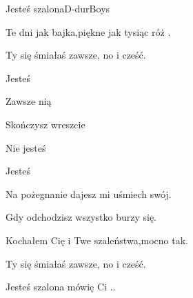 \begin{song}{Jesteś szalona}{D-dur}{}{Boys}{}{}
  \begin{SBVerse}
     

      

    Te dni jak bajka,piękne jak tysiąc róż .

    Ty się śmiałaś zawsze, no i cześć.
  \end{SBVerse}
  \begin{SBChorus}
    Jesteś  

    Zawsze nią 

    Skończysz wreszcie 

    Nie jesteś  

    Jesteś 
  \end{SBChorus}
  \begin{SBVerse}
    Na pożegnanie dajesz mi uśmiech swój.

    Gdy odchodzisz wszystko burzy się.

    Kochałem Cię i Twe szaleństwa,mocno tak.

    Ty się śmiałaś zawsze, no i cześć.
  \end{SBVerse}
  \begin{SBChorus}
    Jesteś szalona mówię Ci ..
  \end{SBChorus}
\end{song}
